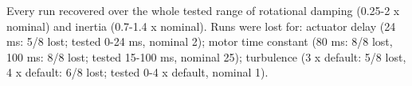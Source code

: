 Every run recovered over the whole tested range of rotational damping (0.25-2 x nominal) and inertia (0.7-1.4 x nominal). Runs were lost for: actuator delay (24 ms: 5/8 lost; tested 0-24 ms, nominal 2); motor time constant (80 ms: 8/8 lost, 100 ms: 8/8 lost; tested 15-100 ms, nominal 25); turbulence (3 x default: 5/8 lost, 4 x default: 6/8 lost; tested 0-4 x default, nominal 1).
